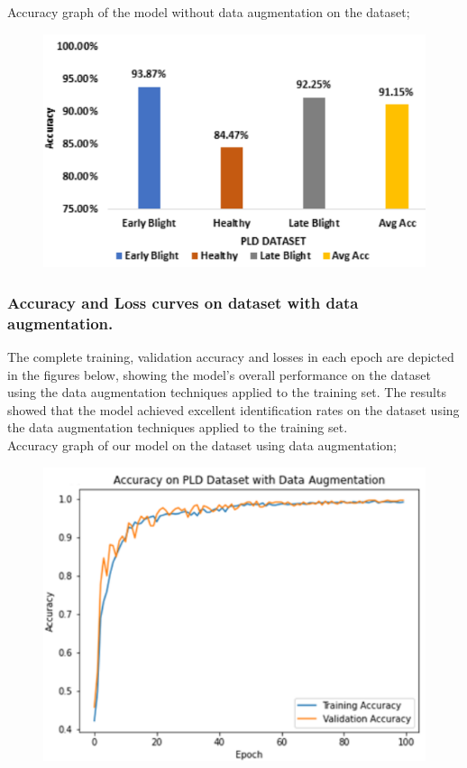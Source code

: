 \documentclass[11pt]{report}
\begin{document}
Accuracy graph of the model without data augmentation on the dataset;\\
\begin{figure}[h]
	\centerline{\small 
		\includegraphics[height=0.2\textheight]  {p2}}
\end{figure}

\newpage
\subsubsection*{Accuracy and Loss curves on dataset with data augmentation.}

The
complete training, validation accuracy and losses in each epoch are depicted in the figures below,
showing the model’s overall performance on the dataset using
the data augmentation techniques applied to the training set. The results showed that the model achieved excellent identification rates on the dataset using the data
augmentation techniques applied to the training set.\\

Accuracy graph of our model on the dataset using data augmentation;\\
\begin{figure}[h]
	\centerline{\small 
		\includegraphics[height=0.25\textheight]  {p3}}
\end{figure}
\end{document}
